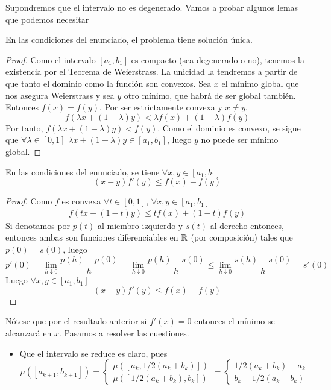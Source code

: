 \documentclass[twoside]{article}
\begin{document}
\begin{solucion} Supondremos que el intervalo no es degenerado. Vamos a probar algunos lemas que podemos necesitar
\begin{lemma}
En las condiciones del enunciado, el problema tiene solución única.
\begin{proof}
Como el intervalo $[a_1,b_1]$ es compacto (sea degenerado o no), tenemos la existencia por el Teorema de Weierstrass. La unicidad la tendremos a partir de que tanto el dominio como la función son convexos. Sea $x$ el mínimo global que nos asegura Weierstrass y sea $y$ otro mínimo, que habrá de ser global también. Entonces $f(x)=f(y)$. Por ser estrictamente convexa y $x\neq y$, 
$$f(\lambda x+(1-\lambda)y) < \lambda f(x)+(1-\lambda)f(y)$$
Por tanto, $f(\lambda x+(1-\lambda)y) < f(y)$. Como el dominio es convexo, se sigue que $\forall \lambda \in[0,1]$ $\lambda x+(1-\lambda)y \in [a_1,b_1]$, luego $y$ no puede ser mínimo global. 
\end{proof}
\end{lemma}
\begin{lemma}
En las condiciones del enunciado, se tiene $\forall x,y\in[a_1,b_1]$
$$
(x-y)f'(y)\leq f(x)-f(y)
$$
\begin{proof}
Como $f$ es convexa $\forall t \in [0,1]$, $\forall x,y\in [a_1,b_1]$
\begin{gather*}
f(tx+(1-t)y)\leq tf(x)+(1-t)f(y)
\end{gather*} 
Si denotamos por $p(t)$ al miembro izquierdo y $s(t)$ al derecho entonces, entonces ambas son funciones diferenciables en $\R$ (por composición) tales que $p(0)=s(0)$, luego
$$
p'(0)=\lim_{h\downarrow 0}\frac{p(h)-p(0)}{h} = \lim_{h\downarrow 0}\frac{p(h)-s(0)}{h} \leq \lim_{h\downarrow 0}\frac{s(h)-s(0)}{h} = s'(0)
$$
Luego $\forall x,y\in [a_1,b_1]$
$$
(x-y)f'(y)\leq f(x)-f(y)
$$
\end{proof}
\end{lemma}
Nótese que por el resultado anterior si $f'(x)=0$ entonces el mínimo se alcanzará en $x$. Pasamos a resolver las cuestiones.
\begin{itemize}
\item Que el intervalo se reduce es claro, pues
$$\mu([a_{k+1},b_{k+1}]) = \begin{cases}
\mu([a_k,1/2(a_k+b_k)])\\
\mu([1/2(a_k+b_k),b_k])
\end{cases}
= \begin{cases}
1/2(a_k+b_k)-a_k\\
b_k - 1/2(a_k+b_k)

\end{cases}$$
\end{itemize}
\end{solucion}
\end{document}
